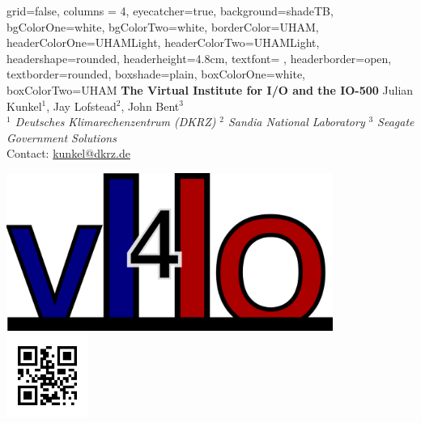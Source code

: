 \documentclass[portrait,a0paper,fontscale=0.4]{baposter}
\begin{document}



\begin{poster}
{ %
  grid=false,
  columns = 4,
  eyecatcher=true,
  background=shadeTB,%
  bgColorOne=white,
  bgColorTwo=white,
  borderColor=UHAM,
  headerColorOne=UHAMLight,
  headerColorTwo=UHAMLight,%
  headershape=rounded,
  headerheight=4.8cm,
  textfont={\setlength{\parindent}{0em} \setlength{\parskip}{0.75em}},
  headerborder=open,
  textborder=rounded,
  boxshade=plain,%
  boxColorOne=white,
  boxColorTwo=UHAM
}{ %
}{ %
  \textbf{The Virtual Institute for I/O and the IO-500}
}{ %
  \vspace{0.5em}
  \textsc
  Julian Kunkel$^1$, Jay Lofstead$^2$, John Bent$^3$
  \\[0.5em]
  \emph{$^1$ Deutsches Klimarechenzentrum (DKRZ)}
  \hspace*{2em}
  \emph{$^2$ Sandia National Laboratory}
   \hspace*{2em}
  \emph{$^3$ Seagate Government Solutions}
  \\[0.5em]
   Contact: \url{kunkel@dkrz.de}
}{
    \begin{minipage}{0.2\textwidth}
     \begin{center}
      \includegraphics[width=0.8\textwidth]{logo-vi4io.png}
      \includegraphics[width=0.2\textwidth]{qr-code.jpg}
     \end{center}
    \end{minipage}
}



\end{poster}
\end{document}
